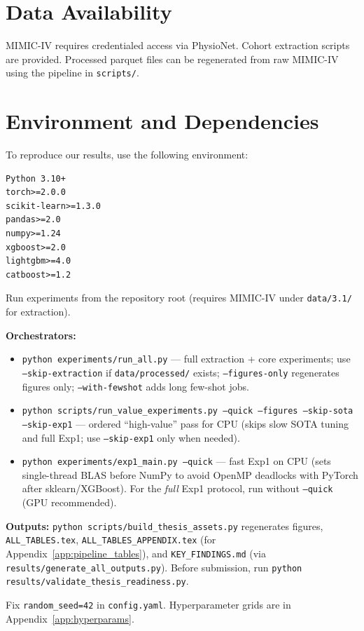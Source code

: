 \section{Data Availability}

MIMIC-IV requires credentialed access via PhysioNet. Cohort extraction scripts are provided. Processed parquet files can be regenerated from raw MIMIC-IV using the pipeline in \texttt{scripts/}.

\section{Environment and Dependencies}

To reproduce our results, use the following environment:

\begin{lstlisting}
Python 3.10+
torch>=2.0.0
scikit-learn>=1.3.0
pandas>=2.0
numpy>=1.24
xgboost>=2.0
lightgbm>=4.0
catboost>=1.2
\end{lstlisting}

Run experiments from the repository root (requires MIMIC-IV under \texttt{data/3.1/} for extraction).

\textbf{Orchestrators:}
\begin{itemize}
  \item \texttt{python experiments/run\_all.py} --- full extraction + core experiments; use \texttt{--skip-extraction} if \texttt{data/processed/} exists; \texttt{--figures-only} regenerates figures only; \texttt{--with-fewshot} adds long few-shot jobs.
  \item \texttt{python scripts/run\_value\_experiments.py --quick --figures --skip-sota --skip-exp1} --- ordered ``high-value'' pass for CPU (skips slow SOTA tuning and full Exp1; use \texttt{--skip-exp1} only when needed).
  \item \texttt{python experiments/exp1\_main.py --quick} --- fast Exp1 on CPU (sets single-thread BLAS before NumPy to avoid OpenMP deadlocks with PyTorch after sklearn/XGBoost). For the \emph{full} Exp1 protocol, run without \texttt{--quick} (GPU recommended).
\end{itemize}

\textbf{Outputs:} \texttt{python scripts/build\_thesis\_assets.py} regenerates figures, \texttt{ALL\_TABLES.tex}, \texttt{ALL\_TABLES\_APPENDIX.tex} (for Appendix~\ref{app:pipeline_tables}), and \texttt{KEY\_FINDINGS.md} (via \texttt{results/generate\_all\_outputs.py}). Before submission, run \texttt{python results/validate\_thesis\_readiness.py}.

Fix \texttt{random\_seed=42} in \texttt{config.yaml}. Hyperparameter grids are in Appendix~\ref{app:hyperparams}.

